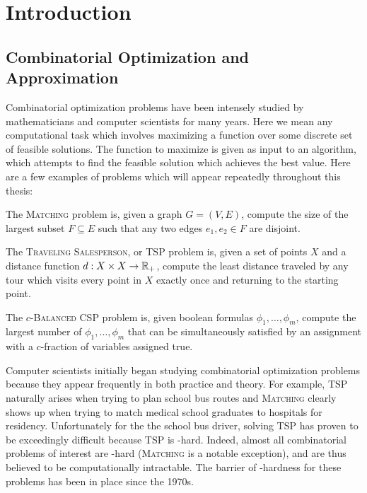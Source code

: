 \chapter{Introduction}\label{cha:introduction}

\section{Combinatorial Optimization and Approximation}
Combinatorial optimization problems have been intensely studied by mathematicians and computer scientists for many years.
Here we mean any computational task which involves maximizing a function over some discrete set of feasible solutions.
The function to maximize is given as input to an algorithm, which attempts to find the feasible solution which achieves the best value. 
Here are a few examples of problems which will appear repeatedly throughout this thesis: 
\begin{example}
The \textsc{Matching} problem is, given a graph $G = (V,E)$, compute the size of the largest subset $F \subseteq E$ such that any two edges $e_1,e_2 \in F$ are disjoint.
\end{example}
\begin{example}
The \textsc{Traveling Salesperson}, or \textsc{TSP} problem is, given a set of points $X$ and a distance function $d: X \times X \rightarrow \mathbb R_+$, compute the least distance traveled by any tour which visits every point in $X$ exactly once and returning to the starting point.
\end{example}
\begin{example}
The \textsc{$c$-Balanced CSP} problem is, given boolean formulas $\phi_1,\dots,\phi_m$, compute the largest number of $\phi_1,\dots,\phi_m$ that can be simultaneously satisfied by an assignment with a $c$-fraction of variables assigned true.
\end{example}

Computer scientists initially began studying combinatorial optimization problems because they appear frequently in both practice and theory.
For example, \textsc{TSP} naturally arises when trying to plan school bus routes and \textsc{Matching} clearly shows up when trying to match medical school graduates to hospitals for residency. Unfortunately for the the school bus driver, solving \textsc{TSP} has proven to be exceedingly difficult because \textsc{TSP} is \np-hard\cite{Karp1972}. Indeed, almost all combinatorial problems of interest are \np-hard (\textsc{Matching} is a notable exception), and are thus believed to be computationally intractable. The barrier of \np-hardness for these problems has been in place since the 1970s.


